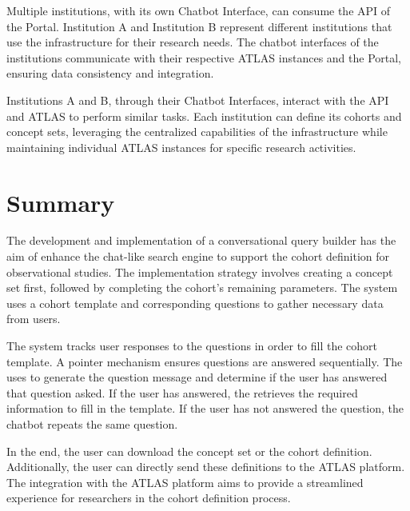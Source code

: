 Multiple institutions, with its own Chatbot Interface, can consume the {\ir} API of the {\ehden} Portal. Institution A and Institution B represent different institutions that use the {\ehden} infrastructure for their research needs. The chatbot interfaces of the institutions communicate with their respective ATLAS instances and the {\ehden} Portal, ensuring data consistency and integration.

Institutions A and B, through their Chatbot Interfaces, interact with the {\ir} API and ATLAS to perform similar tasks. Each institution can define its cohorts and concept sets, leveraging the centralized capabilities of the {\ehden} infrastructure while maintaining individual ATLAS instances for specific research activities.



\section{Summary}

The development and implementation of a conversational query builder has the aim of enhance the  chat-like search engine to support the cohort definition for observational studies. The implementation strategy involves creating a concept set first, followed by completing the cohort's remaining parameters. The system uses a cohort template and corresponding questions to gather necessary data from users.

The system tracks user responses to the questions in order to fill the cohort template. A pointer mechanism ensures questions are answered sequentially. The {\llm} uses {\nlp} to generate the question message and determine if the user has answered that question asked. If the user has answered, the {\llm} retrieves the required information to fill in the template. If the user has not answered the question, the chatbot repeats the same question. 

In the end, the user can download the concept set or the cohort definition. Additionally, the user can directly send these definitions to the ATLAS platform. The integration with the {\ohdsi} ATLAS platform aims to provide a streamlined experience for researchers in the cohort definition process.
